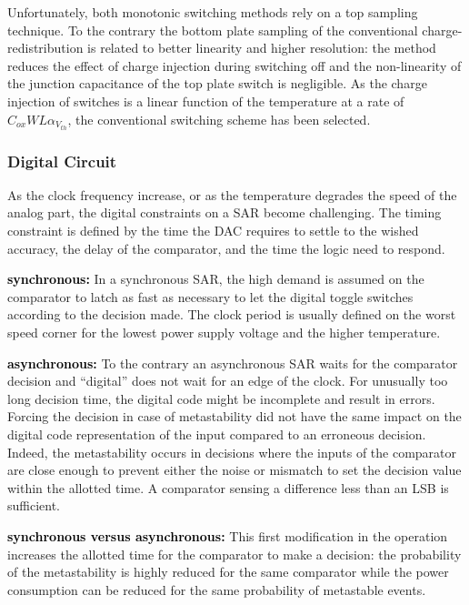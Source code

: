 Unfortunately, both monotonic switching methods rely on a top sampling technique. To the contrary the bottom plate sampling of the conventional charge-redistribution is related to better linearity and higher resolution: the method reduces the effect of charge injection during switching off and the non-linearity of the junction capacitance of the top plate switch is negligible. As the charge injection of switches is a linear function of the temperature at a rate of \(C_{ox}WL\alpha_{V_{th}}\), the conventional switching scheme has been selected.

	\subsubsection{Digital Circuit}         %
As the clock frequency increase, or as the temperature degrades the speed of the analog part, the digital constraints on a SAR become challenging. The timing constraint is defined by the time the DAC requires to settle to the wished accuracy, the delay of the comparator, and the time the logic need to respond.

\textbf{\textcolor{black}{synchronous:}}
In a synchronous SAR, the high demand is assumed on the comparator to latch as fast as necessary to let the digital toggle switches according to the decision made. The clock period is usually defined on the worst speed corner for the lowest power supply voltage and the higher temperature.

\textbf{\textcolor{black}{asynchronous:}}
To the contrary an asynchronous SAR waits for the comparator decision and ``digital'' does not wait for an edge of the clock. For unusually too long decision time, the digital code might be incomplete and result in errors. Forcing the decision in case of metastability did not have the same impact on the digital code representation of the input compared to an erroneous decision. Indeed, the metastability occurs in decisions where the inputs of the comparator are close enough to prevent either the noise or mismatch to set the decision value within the allotted time. A comparator sensing a difference less than an LSB is sufficient.

\textbf{\textcolor{black}{synchronous versus asynchronous:}}
This first modification in the operation increases the allotted time for the comparator to make a decision: the probability of the metastability is highly reduced for the same comparator while the power consumption can be reduced for the same probability of metastable events.

